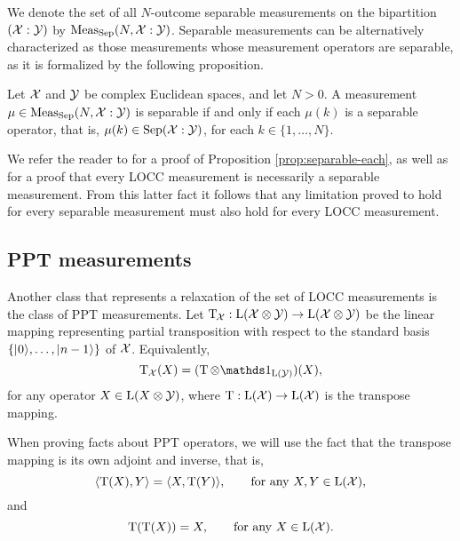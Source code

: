 We denote the set of all $N$-outcome separable measurements on the bipartition 
$(\mathcal{X}:\mathcal{Y})$ by $\mathrm{Meas}_{\mathrm{Sep}}(N, \mathcal{X}:\mathcal{Y})$.
Separable measurements can be alternatively characterized as those measurements
whose measurement operators are separable, as it is formalized by the following
proposition.
\begin{prop}
\label{prop:separable-each}
Let $\mathcal{X}$ and $\mathcal{Y}$ be complex Euclidean spaces, and let $N > 0$. A measurement 
$\mu \in\mathrm{Meas}_{\mathrm{Sep}}(N, \mathcal{X}:\mathcal{Y})$ is separable
if and only if each $\mu(k)$ is a separable operator, that is, 
$\mu(k)\in \mathrm{Sep}(\mathcal{X}:\mathcal{Y})$, for each $k\in\{1, \ldots, N\}$.
\end{prop}

We refer the reader to \cite{Watrous15} for a proof of Proposition \ref{prop:separable-each},
as well as for a proof that every LOCC measurement is necessarily a separable measurement. 
From this latter fact it follows that any limitation proved to hold for 
every separable measurement must also hold for every LOCC measurement.

\subsection{PPT measurements}
\label{sec:ppt-measurements}

Another class that represents a relaxation of the set of LOCC measurements is 
the class of PPT measurements.
Let $\operatorname{T}_{\mspace{-1.5mu}\mathcal{X}}:\mathrm{L}(\mathcal{X}\otimes\mathcal{Y})\rightarrow\mathrm{L}(\mathcal{X}\otimes\mathcal{Y})$ be
the linear mapping representing partial transposition with respect to the
standard basis $\{\lvert\mspace{0.5mu} 0 \mspace{0.5mu} \rangle,\ldots,\lvert\mspace{0.5mu} n-1 \mspace{0.5mu} \rangle\}$ of $\mathcal{X}$. Equivalently,
\begin{equation}
  \pt_{\X}(X) = (\pt\otimes\I_{\Lin(\Y)})(X),
\end{equation}
for any operator $X\in\mathrm{L}(X\otimes\mathcal{Y})$, where $\operatorname{T}:\mathrm{L}(\mathcal{X})\to\mathrm{L}(\mathcal{X})$
is the transpose mapping.

When proving facts about PPT operators, we will use the fact that the transpose 
mapping is its own adjoint and inverse, that is,
\begin{equation}
  \langle \operatorname{T}(X) , Y\rangle = \langle X , \operatorname{T}(Y)\rangle, \qquad\mbox{for any }X,Y\in\mathrm{L}(\mathcal{X}),
\end{equation}
and 
\begin{equation}
  \operatorname{T}(\operatorname{T}(X)) = X,\qquad\mbox{for any }X\in\mathrm{L}(\mathcal{X}).
\end{equation}

